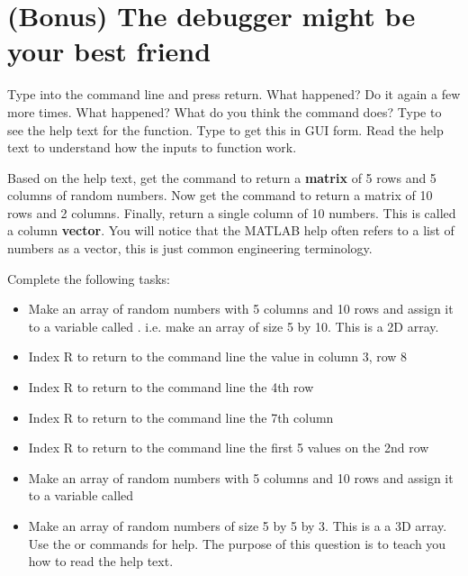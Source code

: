 \documentclass{article}
\begin{document}
\section{(Bonus) The debugger might be your best friend}



\pagebreak


Type  into the command line and press return. What happened?
Do it again a few more times. What happened?
What do you think the  command does?
Type  to see the help text for the  function.
Type  to get this in GUI form.
Read the help text to understand how the inputs to function work.

Based on the help text, get the  command to return a \textbf{matrix} of 5 rows and 5 columns of random numbers. Now get the  command to return a matrix of 10 rows and 2 columns. Finally, return a single column of 10 numbers. This is called a column \textbf{vector}. You will notice that the MATLAB help often refers to a list of numbers as a vector, this is just common engineering terminology.




Complete the following tasks:
\begin{itemize}
\item Make an array of random numbers with 5 columns and 10 rows and assign it to a variable called . i.e.
make an array of size 5 by 10. This is a 2D array.
\item Index R to return to the command line the value in column 3, row 8
\item Index R to return to the command line the 4th row
\item Index R to return to the command line the 7th column
\item Index R to return to the command line the first 5 values on the 2nd row
\item Make an array of random numbers  with 5 columns and 10 rows and assign it to a variable called 
\item Make an array of random numbers of size 5 by 5 by 3. This is a a 3D array. Use the  or  commands
for help. The purpose of this question is to teach you how to read the help text.
\end{itemize}
\end{document}
